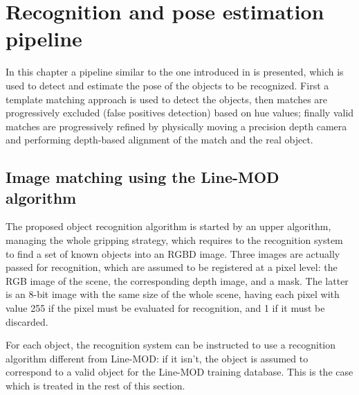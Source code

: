 \section{Recognition and pose estimation pipeline} \label{sec:linemod-pipeline}

In this chapter a pipeline similar to the one introduced in
\cite{linemod-pipeline} is presented, which is used to detect and estimate
the pose of the objects to be recognized. First a template matching approach is
used to detect the objects, then matches are progressively excluded (false
positives detection) based on hue values; finally valid matches are
progressively refined by physically moving a precision depth camera and
performing depth-based alignment of the match and the real object.

\subsection{Image matching using the Line-MOD algorithm} \label{sec:match-with-linemod}
The proposed object recognition algorithm is started by an upper
algorithm, managing the whole gripping strategy, which requires to the
recognition system to find a set of known objects into an RGBD
image. Three images are actually passed for recognition, which are
assumed to be registered at a pixel level: the RGB image of the scene,
the corresponding depth image, and a mask. The latter is an 8-bit
image with the same size of the whole scene, having each pixel with
value 255 if the pixel must be evaluated for recognition, and 1 if it
must be discarded.

For each object, the recognition system can be instructed to use a
recognition algorithm different from Line-MOD: if it isn't, the object
is assumed to correspond to a valid object for the Line-MOD
training database. This is the case which is treated in the rest of
this section.

